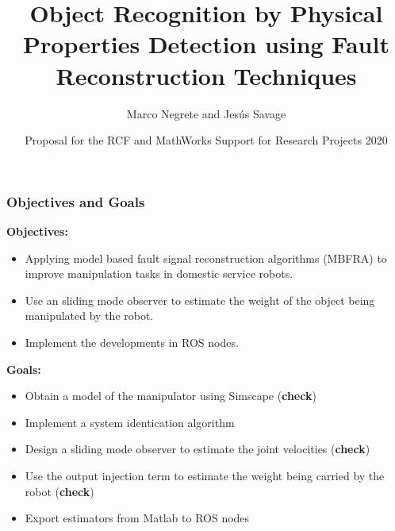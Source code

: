 \documentclass[9pt,spanish,aspectratio=1610]{beamer}
\begin{document}
\renewcommand{\tablename}{Tabla}
\renewcommand{\figurename}{Figura}

\title[Object Recognition using Fault Reconstruction Techniques]{Object Recognition by Physical Properties Detection using Fault Reconstruction Techniques}
\author[Marco Negrete and Jesús Savage]{Marco Negrete and Jesús Savage}
\date[RFC-MathWorks Support for Research Projects 2020]{Proposal for the RCF and MathWorks Support for Research Projects 2020}

\begin{frame}
\titlepage
\end{frame}

\begin{frame}\frametitle{Objectives and Goals}
  \textbf{Objectives:}
  \begin{itemize}
  \item Applying model based fault signal reconstruction algorithms (MBFRA) to improve manipulation tasks in domestic service robots.
  \item Use an sliding mode observer to estimate the weight of the object being manipulated by the robot.
  \item Implement the developments in ROS nodes.
  \end{itemize}

  \textbf{Goals:}
  \begin{itemize}
  \item Obtain a model of the manipulator using Simscape (\textbf{check})
  \item Implement a system identication algorithm 
  \item Design a sliding mode observer to estimate the joint velocities (\textbf{check})
  \item Use the output injection term to estimate the weight being carried by the robot (\textbf{check})
  \item Export estimators from Matlab to ROS nodes
  \end{itemize}
\end{frame}
\end{document}
